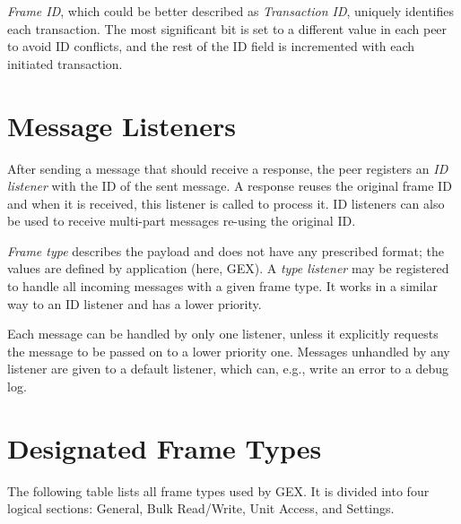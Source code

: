 \textit{Frame ID}, which could be better described as \textit{Transaction ID}, uniquely identifies each transaction. The most significant bit is set to a different value in each peer to avoid ID conflicts, and the rest of the ID field is incremented with each initiated transaction.

\section{Message Listeners}

After sending a message that should receive a response, the peer registers an \textit{ID listener} with the ID of the sent message. A response reuses the original frame ID and when it is received, this listener is called to process it. ID listeners can also be used to receive multi-part messages re-using the original ID.

\textit{Frame type} describes the payload and does not have any prescribed format; the values are defined by application (here, GEX). A \textit{type listener} may be registered to handle all incoming messages with a given frame type. It works in a similar way to an ID listener and has a lower priority.

Each message can be handled by only one listener, unless it explicitly requests the message to be passed on to a lower priority one. Messages unhandled by any listener are given to a default listener, which can, e.g., write an error to a debug log.

\section{Designated Frame Types}

The following table lists all frame types used by GEX. It is divided into four logical sections: General, Bulk Read/Write, Unit Access, and Settings.

